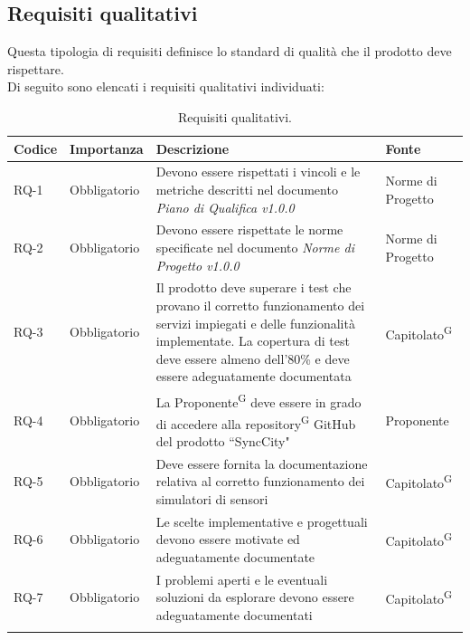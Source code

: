 \documentclass[8pt]{article}
\newcommand{\glossterm}[1]{#1\textsuperscript{G}} %
\begin{document}
\subsection{Requisiti qualitativi}
Questa tipologia di requisiti definisce lo standard di qualità che il prodotto deve rispettare. \\
Di seguito sono elencati i requisiti qualitativi individuati:
\begin{longtable}{p{1.2cm} p{2cm} p{8cm} p{3cm}}
    \toprule
    \textbf{Codice} & \textbf{Importanza} & \textbf{Descrizione} & \textbf{Fonte} \\
    \midrule
            RQ-1 & Obbligatorio & Devono essere rispettati i vincoli e le metriche descritti nel documento \textit{Piano di Qualifica v1.0.0} & Norme di Progetto \\
            RQ-2 & Obbligatorio & Devono essere rispettate le norme specificate nel documento \textit{Norme di Progetto v1.0.0} & Norme di Progetto \\
            RQ-3 & Obbligatorio & Il prodotto deve superare i test che provano il corretto funzionamento dei servizi impiegati e delle funzionalità implementate. La copertura di test deve essere almeno dell'80\% e deve essere adeguatamente documentata & \glossterm{Capitolato} \\
            RQ-4 & Obbligatorio & La \glossterm{Proponente} deve essere in grado di accedere alla \glossterm{repository} GitHub del prodotto ``SyncCity" & Proponente \\
            RQ-5 & Obbligatorio & Deve essere fornita la documentazione relativa al corretto funzionamento dei simulatori di sensori & \glossterm{Capitolato} \\
            RQ-6 & Obbligatorio & Le scelte implementative e progettuali devono essere motivate ed adeguatamente documentate & \glossterm{Capitolato} \\
            RQ-7 & Obbligatorio & I problemi aperti e le eventuali soluzioni da esplorare devono essere adeguatamente documentati & \glossterm{Capitolato} \\
		\bottomrule
	\caption{Requisiti qualitativi.}
	\label{table:Requisiti qualitativi}
\end{longtable}
\end{document}
